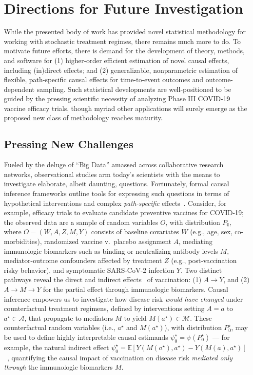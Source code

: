 \chapter{Directions for Future Investigation}\label{six}

While the presented body of work has provided novel statistical methodology for
working with stochastic treatment regimes, there remains much more to do. To
motivate future efforts, there is demand for the development of theory, methods,
and software for (1) higher-order efficient estimation of novel causal effects,
including (in)direct effects; and (2) generalizable, nonparametric estimation of
flexible, path-specific causal effects for time-to-event outcomes and
outcome-dependent sampling. Such statistical developments are well-positioned to
be guided by the pressing scientific necessity of analyzing Phase III COVID-19
vaccine efficacy trials, though myriad other applications will surely emerge as
the proposed new class of methodology reaches maturity.

\section{Pressing New Challenges}

Fueled by the deluge of ``Big Data'' amassed across collaborative research
networks, observational studies arm today's scientists with the means to
investigate elaborate, albeit daunting, questions. Fortunately, formal causal
inference frameworks outline tools for expressing such questions in terms of
hypothetical interventions and complex \textit{path-specific}
effects~\citep{pearl2009causality,hernan2021causal}. Consider, for example,
efficacy trials to evaluate candidate preventive vaccines for COVID-19; the
observed data are a sample of random variables $O$, with distribution $P_0$,
where $O = (W, A, Z, M, Y)$ consists of baseline covariates $W$ (e.g., age, sex,
co-morbidities), randomized vaccine v.~placebo assignment $A$, mediating
immunologic biomarkers such as binding or neutralizing antibody levels $M$,
mediator-outcome confounders affected by treatment $Z$ (e.g., post-vaccination
risky behavior), and symptomatic SARS-CoV-2 infection $Y$. Two distinct pathways
reveal the direct and indirect effects~\citep{vanderweele2015explanation} of
vaccination: (1) $A \rightarrow Y$, and (2) $A \rightarrow M \rightarrow Y$ for
the partial effect through immunologic biomarkers. Causal inference empowers us
to investigate how disease risk \textit{would have changed} under counterfactual
treatment regimens, defined by interventions setting $A = a$ to $a^{\star} \in
\mathcal{A}$, that propagate to mediators $M$ to yield $M(a^{\star}) \in
\mathcal{M}$. These counterfactual random variables (i.e., $a^{\star}$ and
$M(a^{\star})$), with distribution $P_0^{\star}$, may be used to define highly
interpretable causal estimands $\psi_0^{\star} = \psi(P_0^{\star})$ --- for
example, the natural indirect effect $\psi_0^{\star}
= \mathbb{E}[Y(M(a^{\star}), a^{\star}) - Y(M(a),
a^{\star})]$~\citep{robins1992identifiability}, quantifying the causal impact of
vaccination on disease risk \textit{mediated only through} the immunologic
biomarkers $M$.

